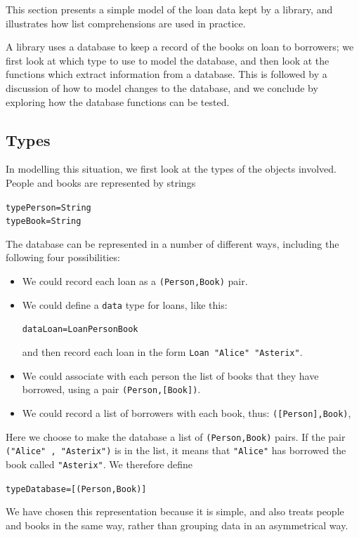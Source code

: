 This section presents a simple model of the loan data kept by a library,  and
illustrates how list comprehensions are used in practice.

A library uses a database to keep a record of the books on loan to
borrowers; we first look at which type to use to model the database, and
then look at the functions which extract information from a database.
This is followed by a discussion of how to model changes to the database, and we
conclude by exploring how the database functions can be tested.

\subsection*{Types}

In modelling this situation, we first look at the types of the objects
involved. People and books are represented by strings
\begin{alltt}
type Person = String
type Book   = String
\end{alltt}
The database can be represented in a number of different ways, including the following four possibilities:
\begin{itemize}
\item We could record each loan as a \texttt{(Person,Book)} pair.
\item We could define a \texttt{data} type for loans, like this:
\begin{alltt}
data Loan = Loan Person Book
\end{alltt}
and then record each loan in the form \texttt{Loan "Alice" "Asterix"}.
\item We could associate with each person the list of books that they
have borrowed, using a pair \texttt{(Person,[Book])}.
\item We could record a list of borrowers with each book, thus:
\texttt{([Person],Book)},
\end{itemize}
Here we choose to
make the database a list of \texttt{(Person,Book)} pairs. If the pair \texttt{("Alice" ,
"Asterix")} is in the list, it means that \texttt{"Alice"} has borrowed the book
called \texttt{"Asterix"}. We therefore define
\begin{alltt} 
type Database = [ (Person , Book) ] 
\end{alltt}
We have chosen this representation because it is simple, and also
treats people and books in the same way, rather than grouping data in an
asymmetrical way.

